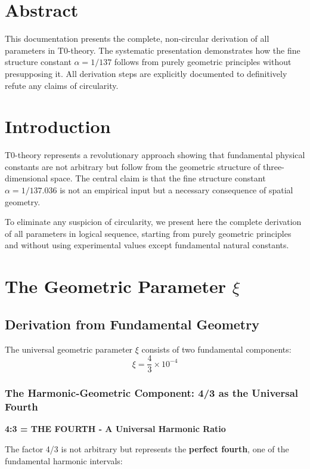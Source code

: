 \section*{Abstract}
		This documentation presents the complete, non-circular derivation of all parameters in T0-theory. The systematic presentation demonstrates how the fine structure constant $\alpha = 1/137$ follows from purely geometric principles without presupposing it. All derivation steps are explicitly documented to definitively refute any claims of circularity.


	\section{Introduction}
	
	T0-theory represents a revolutionary approach showing that fundamental physical constants are not arbitrary but follow from the geometric structure of three-dimensional space. The central claim is that the fine structure constant $\alpha = 1/137.036$ is not an empirical input but a necessary consequence of spatial geometry.
	
	To eliminate any suspicion of circularity, we present here the complete derivation of all parameters in logical sequence, starting from purely geometric principles and without using experimental values except fundamental natural constants.
	
\section{The Geometric Parameter $\xi$}

\subsection{Derivation from Fundamental Geometry}

The universal geometric parameter $\xi$ consists of two fundamental components:
\begin{equation}
	\xi = \frac{4}{3} \times 10^{-4}
\end{equation}

\subsubsection{The Harmonic-Geometric Component: 4/3 as the Universal Fourth}

\textbf{4:3 = THE FOURTH - A Universal Harmonic Ratio}

The factor 4/3 is not arbitrary but represents the \textbf{perfect fourth}, one of the fundamental harmonic intervals:

